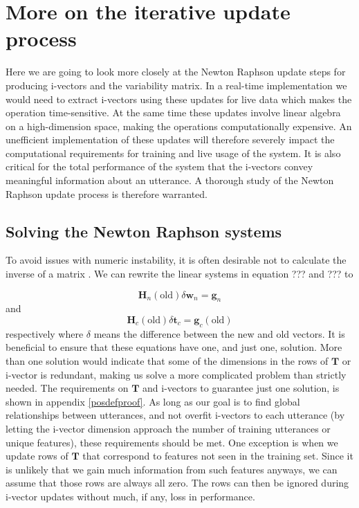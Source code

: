 \chapter{More on the iterative update process}

Here we are going to look more closely at the Newton Raphson update steps for producing i-vectors and the variability matrix. In a real-time implementation we would need to extract i-vectors using these updates for live data which makes the operation time-sensitive. At the same time these updates involve linear algebra on a high-dimension space, making the operations computationally expensive. An unefficient implementation of these updates will therefore severely impact the computational requirements for training and live usage of the system. It is also critical for the total performance of the system that the i-vectors convey meaningful information about an utterance. A thorough study of the Newton Raphson update process is therefore warranted. 

\section{Solving the Newton Raphson systems}

To avoid issues with numeric instability, it is often desirable not to calculate the inverse of a matrix \cite[p. 743]{cormen}. We can rewrite the linear systems in equation ??? and ??? to

\begin{equation}\label{lupeqN}
\mathbf{H}_n(\text{old}) \delta\mathbf{w}_n = \mathbf{g}_n
\end{equation}
and
\begin{equation}\label{lupeqC}
\mathbf{H}_c(\text{old}) \delta \mathbf{t}_c = \mathbf{g}_c(\text{old})
\end{equation}
respectively where $\delta$ means the difference between the new and old vectors. It is beneficial to ensure that these equations have one, and just one, solution. More than one solution would indicate that some of the dimensions in the rows of $\mathbf{T}$ or i-vector is redundant, making us solve a more complicated problem than strictly needed. The requirements on $\mathbf{T}$ and i-vectors to guarantee just one solution, is shown in appendix \ref{posdefproof}. As long as our goal is to find global relationships between utterances, and not overfit i-vectors to each utterance (by letting the i-vector dimension approach the number of training utterances or unique features), these requirements should be met. One exception is when we update rows of $\mathbf{T}$ that correspond to features not seen in the training set. Since it is unlikely that we gain much information from such features anyways, we can assume that those rows are always all zero. The rows can then be ignored during i-vector updates without much, if any, loss in performance.

